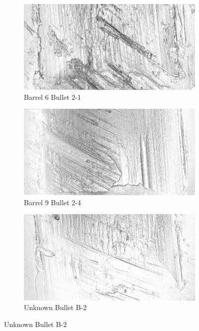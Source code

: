 \documentclass[aoas, preprint]{imsart}\usepackage[]{graphicx}\usepackage[]{color}
\begin{document}
\begin{figure}
  \centering
\begin{subfigure}[t]{.49\textwidth}\centering
\caption{Barrel 6 Bullet 2-1}
\includegraphics[width=\textwidth]{images/br6-2-1-grey.png}
\end{subfigure}
\begin{subfigure}[t]{.49\textwidth}\centering
\caption{Barrel 9 Bullet 2-4}
\includegraphics[width=\textwidth]{images/br9-2-4-grey.png}
\end{subfigure}
\begin{subfigure}[t]{.49\textwidth}\centering
\caption{Unknown Bullet B-2}
\includegraphics[width=\textwidth]{images/b-2-grey.png}

\end{subfigure}
\end{figure}
\end{document}
